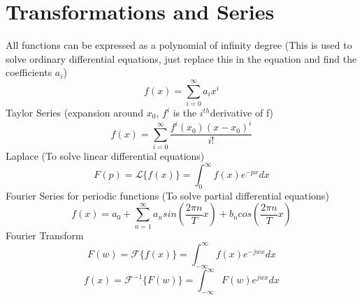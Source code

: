 \documentclass{article}
\begin{document}
\section{Transformations and Series}
All functions can be expressed as a polynomial of infinity degree (This is used to solve ordinary differential equations, just replace this in the equation and find the coefficients $a_i$)
\begin{equation}
  f(x) = \sum_{i=0}^{\infty} a_ix^i
\end{equation}
Taylor Series (expansion around $x_0$, $f^{i}$ is the $i^{th}$derivative of f)
\begin{equation}
  f(x) = \sum_{i=0}^{\infty}\frac{f^{i}(x_0)(x-x_0)^i}{i!}
\end{equation}
Laplace (To solve linear differential equations)
\begin{equation}
  F(p) = \mathscr{L}\{f(x)\} = \int_0^{\infty} f(x) e^{-px}dx
\end{equation}
Fourier Series for periodic functions (To solve partial differential equations)
\begin{equation}
  f(x) = a_0  + \sum_{n=1}^{\infty} a_n sin(\frac{2\pi n}{T}x) + b_n cos(\frac{2\pi n}{T}x)
\end{equation}
Fourier Transform
\begin{equation}
  F(w) = \mathscr{F}\{f(x)\} = \int_{-\infty}^{\infty}f(x)e^{-jwx} dx
\end{equation}
\begin{equation}
  f(x) = \mathscr{F}^{-1}\{F(w)\} = \int_{-\infty}^{\infty}F(w)e^{jwx} dx
\end{equation}
\end{document}
